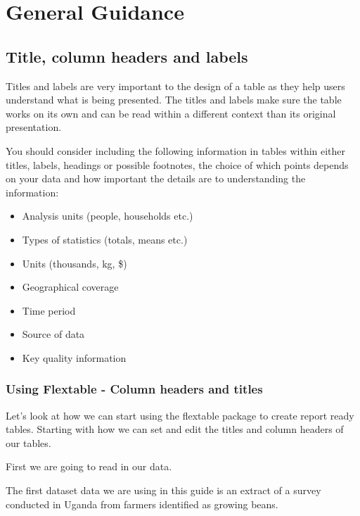 \documentclass[
]{book}
\providecommand{\tightlist}{%
  \setlength{\itemsep}{0pt}\setlength{\parskip}{0pt}}
\begin{document}
\hypertarget{general-guidance}{%
\section{General Guidance}\label{general-guidance}}

\hypertarget{title-column-headers-and-labels}{%
\subsection{Title, column headers and labels}\label{title-column-headers-and-labels}}

Titles and labels are very important to the design of a table as they help users understand what is being presented. The titles and labels make sure the table works on its own and can be read within a different context than its original presentation.

You should consider including the following information in tables within either titles, labels, headings or possible footnotes, the choice of which points depends on your data and how important the details are to understanding the information:

\begin{itemize}
\tightlist
\item
  Analysis units (people, households etc.)
\item
  Types of statistics (totals, means etc.)
\item
  Units (thousands, kg, \$)
\item
  Geographical coverage
\item
  Time period
\item
  Source of data
\item
  Key quality information
\end{itemize}

\hypertarget{using-flextable---column-headers-and-titles}{%
\subsubsection{Using Flextable - Column headers and titles}\label{using-flextable---column-headers-and-titles}}

Let's look at how we can start using the flextable package to create report ready tables. Starting with how we can set and edit the titles and column headers of our tables.

First we are going to read in our data.

The first dataset data we are using in this guide is an extract of a survey conducted in Uganda from farmers identified as growing beans.
\end{document}
